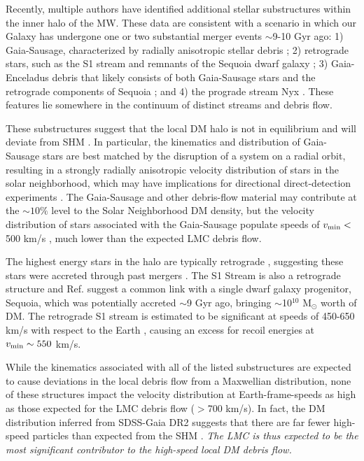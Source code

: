 \documentclass[letterpaper,11pt]{article}
\begin{document}
Recently, multiple authors have identified additional stellar substructures 
within the inner halo of the MW. These data are
consistent with a scenario in which our Galaxy has undergone one or two  
substantial merger events $\sim$9-10 Gyr ago:
1) Gaia-Sausage, characterized by radially anisotropic stellar debris \citep{Belokurov2018} ; 2) retrograde 
stars, such as the S1 stream and remnants of the Sequoia dwarf galaxy \citep{Myeong2019}; 3) Gaia-Enceladus debris that likely consists of both Gaia-Sausage stars and the retrograde components of Sequoia \citep{Helmi2018,Kruijssen2019}; and 4) the prograde stream Nyx \cite{Necib2019}. These features lie somewhere in the continuum of distinct streams and debris flow. %

These substructures suggest
that the local DM halo
is not in equilibrium and will deviate from SHM \cite{Necib:2019iwb}. 
In particular, the kinematics and distribution of Gaia-Sausage stars are best matched by the disruption of a system on a radial orbit, resulting in a strongly radially anisotropic velocity distribution of stars in the solar neighborhood, which may have implications for directional direct-detection experiments \citep{Evans:2019bqy}. The Gaia-Sausage and other debris-flow material may contribute at the $\sim 10\%$ level to the Solar Neighborhood DM density, but the velocity distribution of stars associated with the Gaia-Sausage populate speeds of $v_{\rm min} <$500 km/s \citep{Belokurov2018,Evans:2019bqy,Necib:2018igl}, much lower than the expected LMC debris flow. 


The highest energy stars in the halo are typically retrograde \citep{Myeong2018,Myeong2018b,Myeong2018c,Helmi:2017}, suggesting these stars were accreted through past mergers \citep{Quinn:1986,Norris:1989,Carollo:2007, Beers:2012}.  The S1 Stream is also a retrograde structure and Ref. \citep{Myeong2019}
suggest a common link with a single dwarf galaxy progenitor, Sequoia, which was potentially 
accreted $\sim$9 Gyr ago, bringing $\sim$10$^{10}$ M$_\odot$ worth of DM.  
The retrograde S1 stream is estimated to be significant at speeds of 450-650 km/s with respect
to the Earth \citep{Buckley:2019, OHare:2018trr}, causing an excess for recoil energies at $v_{\rm min} \sim 550$ km/s. 

While the kinematics associated with all of the listed substructures are expected to cause deviations in the local debris flow from a Maxwellian distribution, none of these structures impact the velocity distribution at Earth-frame-speeds as high as those expected for the LMC debris flow ($>$700 km/s). In fact, the DM distribution inferred from SDSS-Gaia DR2 suggests that there are far fewer high-speed particles than expected from the SHM \citep{Necib:2019iwb}.
{\it The LMC is thus expected to be the most significant contributor to the high-speed local DM debris flow.} 
\end{document}
